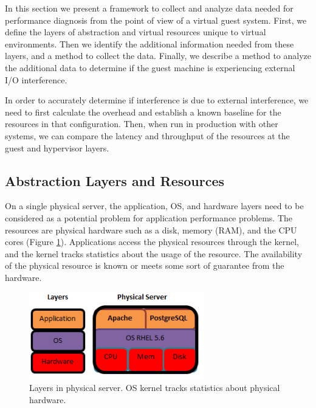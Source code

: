 In this section we present a framework to collect and analyze data needed for performance diagnosis from the point of view of a virtual guest system. 
First, we define the layers of abstraction and virtual resources unique to virtual environments.  
Then we identify the additional information needed from these layers, and a method to collect the data.
Finally, we describe a method to analyze the additional data to determine if the guest machine is experiencing external I/O interference.

In order to accurately determine if interference is due to external interference, we need to first calculate the overhead and establish a known baseline for the resources in that configuration.  Then, when run in production with other systems, we can compare the latency and throughput of the resources at the guest and hypervisor layers.  

\subsection{Abstraction Layers and Resources}
On a single physical server, the application, OS, and hardware layers need to be considered as a potential problem for application performance problems.  The resources are physical hardware such as a disk, memory (RAM), and the CPU cores (Figure \ref{PhysicalLayers}).  Applications access the physical resources through the kernel, and the kernel tracks statistics about the usage of the resource.  The availability of the physical resource is known or meets some sort of guarantee from the hardware.

\begin{figure}[!h]
  \includegraphics[width=3in]{images/LayersPhysical.png}
  \caption{Layers in physical server.  OS kernel tracks statistics about physical hardware.}
  \label{PhysicalLayers}
\end{figure}

